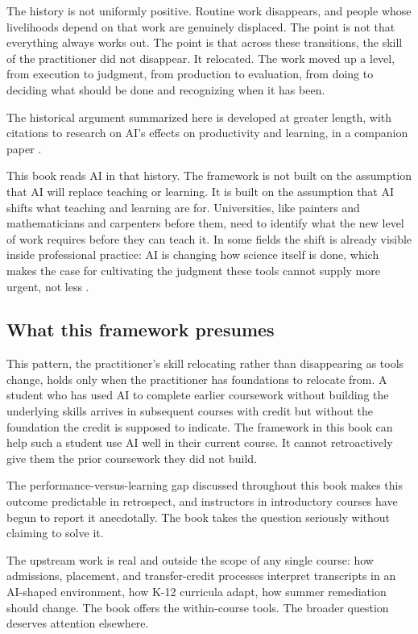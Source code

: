 \documentclass{SIAMbook2023}
\begin{document}
\begin{thepreface}
The history is not uniformly positive. Routine work disappears, and people whose livelihoods depend on that work are genuinely displaced. The point is not that everything always works out. The point is that across these transitions, the skill of the practitioner did not disappear. It relocated. The work moved up a level, from execution to judgment, from production to evaluation, from doing to deciding what should be done and recognizing when it has been.

The historical argument summarized here is developed at greater length, with citations to research on AI's effects on productivity and learning, in a companion paper \citep{hyman2026next}.

This book reads AI in that history. The framework is not built on the assumption that AI will replace teaching or learning. It is built on the assumption that AI shifts what teaching and learning are for. Universities, like painters and mathematicians and carpenters before them, need to identify what the new level of work requires before they can teach it. In some fields the shift is already visible inside professional practice: AI is changing how science itself is done, which makes the case for cultivating the judgment these tools cannot supply more urgent, not less \citep{erduran2023transforming}.

\subsection*{What this framework presumes}

This pattern, the practitioner's skill relocating rather than disappearing as tools change, holds only when the practitioner has foundations to relocate from. A student who has used AI to complete earlier coursework without building the underlying skills arrives in subsequent courses with credit but without the foundation the credit is supposed to indicate. The framework in this book can help such a student use AI well in their current course. It cannot retroactively give them the prior coursework they did not build.

The performance-versus-learning gap discussed throughout this book makes this outcome predictable in retrospect, and instructors in introductory courses have begun to report it anecdotally. The book takes the question seriously without claiming to solve it.

The upstream work is real and outside the scope of any single course: how admissions, placement, and transfer-credit processes interpret transcripts in an AI-shaped environment, how K-12 curricula adapt, how summer remediation should change. The book offers the within-course tools. The broader question deserves attention elsewhere.


\end{thepreface}
\end{document}
